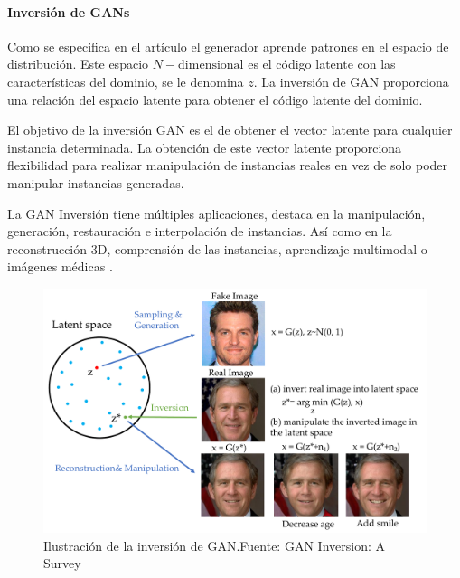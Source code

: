 
\paragraph{Inversión de GANs}
\label{ch:2:GAN-inversion}

Como se especifica en el artículo \cite{GANInversionSurvey-xia2022gan} el generador aprende patrones en el espacio de distribución. Este espacio ${N-\text{dimensional}}$ es el código latente con las características del dominio, se le denomina ${z}$. La inversión de \gls{GAN} proporciona una relación del espacio latente para obtener el código latente del dominio.

El objetivo de la inversión \gls{GAN} es el de obtener el vector latente para cualquier instancia determinada. La obtención de este vector latente proporciona flexibilidad para realizar manipulación de instancias reales en vez de solo poder manipular instancias generadas.

La GAN Inversión tiene múltiples aplicaciones, destaca en la manipulación, generación, restauración e interpolación de instancias. Así como en la reconstrucción 3D, comprensión de las instancias, aprendizaje multimodal o imágenes médicas \cite{GANInversionSurvey-xia2022gan}.

\begin{figure}[H]
    \centering
    \includegraphics[width=0.5\linewidth]{figures/chapter02/overview.pdf}
    \caption{Ilustración de la inversión de GAN.\newline{}Fuente: GAN Inversion: A Survey \cite{GANInversionSurvey-xia2022gan}}
    \label{fig:gan-inversion}
\end{figure}

